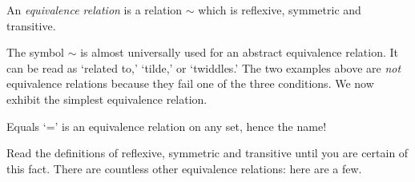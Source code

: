 \begin{defn}{}{}
	An \emph{equivalence relation} is a relation $\sim$ which is reflexive, symmetric and transitive.
\end{defn}

The symbol $\sim$ is almost universally used for an abstract equivalence relation. It can be read as `related to,' `tilde,' or `twiddles.' The two examples above are \emph{not} equivalence relations because they fail one of the three conditions. We now exhibit the simplest equivalence relation.

\begin{example}{}{}
	Equals `=' is an equivalence relation on any set, hence the name!
\end{example}

Read the definitions of reflexive, symmetric and transitive until you are certain of this fact. There are countless other equivalence relations: here are a few.

